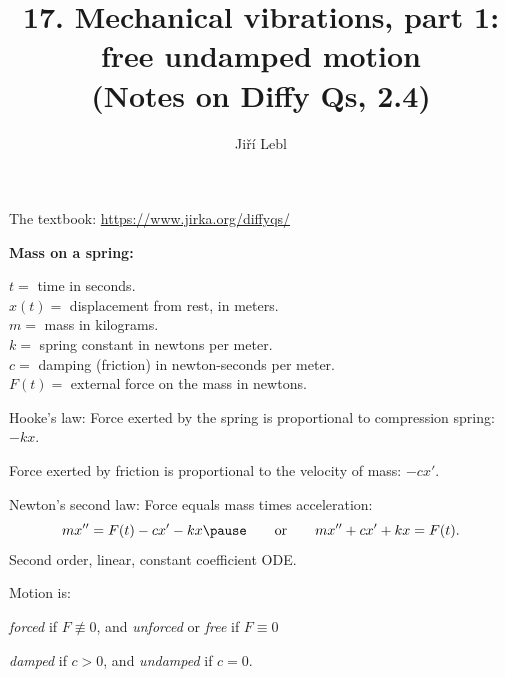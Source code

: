 \documentclass[10pt,aspectratio=169]{beamer}
\author{Ji\v{r}\'i Lebl}
\institute[OSU]{%
Oklahoma State University%
}
\title{17. Mechanical vibrations, part 1: free undamped motion\\(Notes on Diffy Qs, 2.4)}
\date{}
\begin{document}
\begin{frame}
\titlepage


\begin{center}
The textbook: \url{https://www.jirka.org/diffyqs/}
\end{center}
\end{frame}

\begin{frame}
\textbf{Mass on a spring:}

\vspace*{-12pt}
\hspace*{3in}%

\vspace*{-0.55in}
$t = {}$ time in seconds.\\
$x(t) = {}$ displacement from rest, in meters.\\
$m = {}$ mass in kilograms.\\
$k = {}$ spring constant in newtons per meter.\\
$c = {}$ damping (friction) in newton-seconds per meter.\\
$F(t) = {}$ external force on the mass in newtons.

\medskip
\pause

Hooke's law: 
Force exerted by the spring is proportional to
compression spring: $-kx$.

\pause
Force exerted by friction is proportional to the velocity of mass: $-cx'$.

\pause
Newton's second law: Force equals mass times acceleration:
\[
mx'' = F(t)-cx'-kx
\pause
\qquad
\text{or}
\qquad
mx'' + cx' + kx = F(t) .
\]
\pause
Second order, linear, constant coefficient ODE.

\medskip
\pause

Motion is:

\vspace*{-12pt}%
\hspace*{1in}%
\emph{forced} if $F \not\equiv 0$, \quad and
\emph{unforced} or \emph{free} if $F \equiv 0$

\pause
\hspace*{1in}%
\emph{damped} if $c > 0$, \quad
and \emph{undamped} if $c = 0$.
\end{frame}
\end{document}
